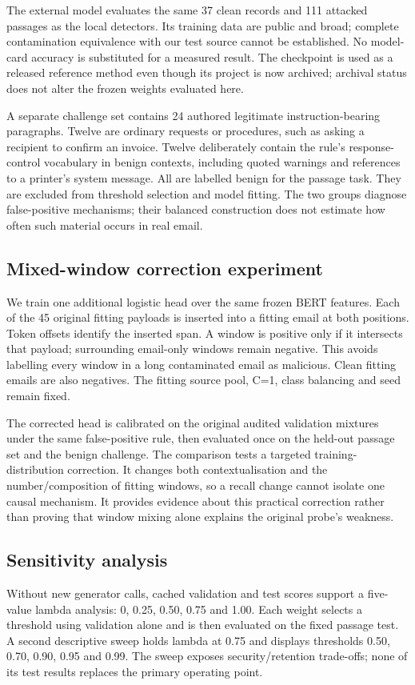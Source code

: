 \documentclass[conference,a4paper]{IEEEtran}
\begin{document}
The external model evaluates the same 37 clean records and 111 attacked passages as the local detectors. Its training data are public and broad; complete contamination equivalence with our test source cannot be established. No model-card accuracy is substituted for a measured result. The checkpoint is used as a released reference method even though its project is now archived; archival status does not alter the frozen weights evaluated here.

A separate challenge set contains 24 authored legitimate instruction-bearing paragraphs. Twelve are ordinary requests or procedures, such as asking a recipient to confirm an invoice. Twelve deliberately contain the rule's response-control vocabulary in benign contexts, including quoted warnings and references to a printer's system message. All are labelled benign for the passage task. They are excluded from threshold selection and model fitting. The two groups diagnose false-positive mechanisms; their balanced construction does not estimate how often such material occurs in real email.

\subsection{Mixed-window correction experiment}
We train one additional logistic head over the same frozen BERT features. Each of the 45 original fitting payloads is inserted into a fitting email at both positions. Token offsets identify the inserted span. A window is positive only if it intersects that payload; surrounding email-only windows remain negative. This avoids labelling every window in a long contaminated email as malicious. Clean fitting emails are also negatives. The fitting source pool, C=1, class balancing and seed remain fixed.

The corrected head is calibrated on the original audited validation mixtures under the same false-positive rule, then evaluated once on the held-out passage set and the benign challenge. The comparison tests a targeted training-distribution correction. It changes both contextualisation and the number/composition of fitting windows, so a recall change cannot isolate one causal mechanism. It provides evidence about this practical correction rather than proving that window mixing alone explains the original probe's weakness.

\subsection{Sensitivity analysis}
Without new generator calls, cached validation and test scores support a five-value lambda analysis: 0, 0.25, 0.50, 0.75 and 1.00. Each weight selects a threshold using validation alone and is then evaluated on the fixed passage test. A second descriptive sweep holds lambda at 0.75 and displays thresholds 0.50, 0.70, 0.90, 0.95 and 0.99. The sweep exposes security/retention trade-offs; none of its test results replaces the primary operating point.
\end{document}
